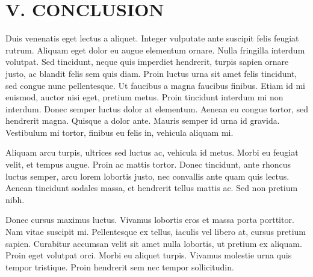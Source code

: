 \documentclass[
	letterpaper, %
	10pt, %
	unnumberedsections, %
	twoside, %
]{LTJournalArticle}
\begin{document}
\section{V. CONCLUSION}

Duis venenatis eget lectus a aliquet. Integer vulputate ante suscipit felis feugiat rutrum. Aliquam eget dolor eu augue elementum ornare. Nulla fringilla interdum volutpat. Sed tincidunt, neque quis imperdiet hendrerit, turpis sapien ornare justo, ac blandit felis sem quis diam. Proin luctus urna sit amet felis tincidunt, sed congue nunc pellentesque. Ut faucibus a magna faucibus finibus. Etiam id mi euismod, auctor nisi eget, pretium metus. Proin tincidunt interdum mi non interdum. Donec semper luctus dolor at elementum. Aenean eu congue tortor, sed hendrerit magna. Quisque a dolor ante. Mauris semper id urna id gravida. Vestibulum mi tortor, finibus eu felis in, vehicula aliquam mi.

Aliquam arcu turpis, ultrices sed luctus ac, vehicula id metus. Morbi eu feugiat velit, et tempus augue. Proin ac mattis tortor. Donec tincidunt, ante rhoncus luctus semper, arcu lorem lobortis justo, nec convallis ante quam quis lectus. Aenean tincidunt sodales massa, et hendrerit tellus mattis ac. Sed non pretium nibh. 

Donec cursus maximus luctus. Vivamus lobortis eros et massa porta porttitor. Nam vitae suscipit mi. Pellentesque ex tellus, iaculis vel libero at, cursus pretium sapien. Curabitur accumsan velit sit amet nulla lobortis, ut pretium ex aliquam. Proin eget volutpat orci. Morbi eu aliquet turpis. Vivamus molestie urna quis tempor tristique. Proin hendrerit sem nec tempor sollicitudin.


\printbibliography %
\end{document}
